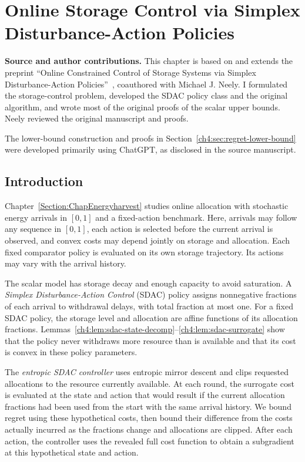 \chapter{Online Storage Control via Simplex Disturbance-Action Policies}
\label{Section:ChapControl}
\noindent\textbf{Source and author contributions.}
This chapter is based on and extends the preprint
``Online Constrained Control of Storage Systems via Simplex Disturbance-Action
Policies''~\cite{asgari2026sdac}, coauthored with Michael J. Neely.
I formulated the storage-control problem, developed the SDAC policy class
and the original algorithm, and wrote most of the original proofs of the
scalar upper bounds. Neely reviewed the original manuscript and proofs.

The lower-bound construction and proofs in
Section~\ref{ch4:sec:regret-lower-bound} were developed primarily using
\mbox{ChatGPT}, as disclosed in the source manuscript.

\section{Introduction}
\label{ch4:sec:introduction}

Chapter~\ref{Section:ChapEnergyharvest} studies online allocation with
stochastic energy arrivals in $[0,1]$ and a fixed-action benchmark. Here,
arrivals may follow any sequence in $[0,1]$, each action is selected before
the current arrival is observed, and convex costs may depend jointly on
storage and allocation. Each fixed comparator policy is evaluated on its
own storage trajectory. Its actions may vary with the arrival history.

The scalar model has storage decay and enough capacity to avoid saturation.
A \emph{Simplex Disturbance-Action Control} (SDAC) policy assigns
nonnegative fractions of each arrival to withdrawal delays, with total
fraction at most one. For a fixed SDAC policy, the storage level and allocation
are affine functions of its allocation fractions.
Lemmas~\ref{ch4:lem:sdac-state-decomp}--\ref{ch4:lem:sdac-surrogate} show that
the policy never withdraws more resource than is available and
that its cost is convex in these policy parameters.

The \emph{entropic SDAC controller} uses entropic mirror descent and clips
requested allocations to the resource currently available. At each round,
the surrogate cost is evaluated at the state and action that would result
if the current allocation fractions had been used from the start with the
same arrival history. We bound regret using these hypothetical costs, then
bound their difference from the costs actually incurred as the fractions
change and allocations are clipped.
After each action, the controller uses the revealed full cost function to
obtain a subgradient at this hypothetical state and action.

